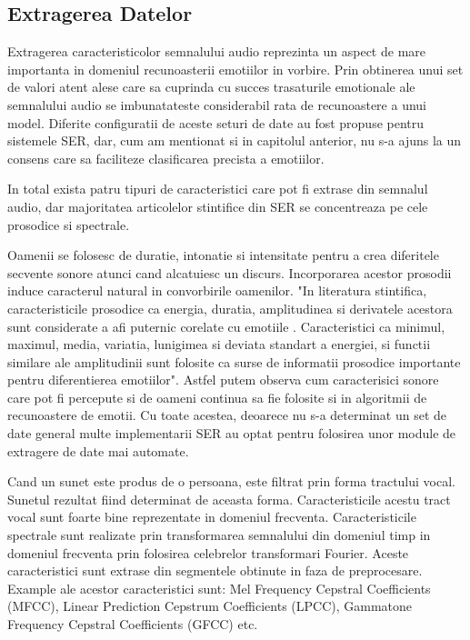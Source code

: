 \documentclass[a4paper,12pt, twoside]{book}
\begin{document}
					\subsection{Extragerea Datelor}
						Extragerea caracteristicolor semnalului audio reprezinta un aspect de mare importanta in domeniul recunoasterii emotiilor in vorbire. Prin obtinerea unui set de valori atent alese care sa cuprinda cu succes trasaturile emotionale ale semnalului audio se imbunatateste considerabil rata de recunoastere a unui model. Diferite configuratii de aceste seturi de date au fost propuse pentru sistemele SER, dar, cum am mentionat si in capitolul anterior, nu s-a ajuns la un consens care sa faciliteze clasificarea precista a emotiilor. \par
						In total exista patru tipuri de caracteristici care pot fi extrase din semnalul audio, dar majoritatea articolelor stintifice din SER se concentreaza pe cele prosodice si spectrale.\par
						Oamenii se folosesc de duratie, intonatie si intensitate pentru a crea diferitele secvente sonore atunci cand alcatuiesc un discurs. Incorporarea acestor prosodii induce caracterul natural in convorbirile oamenilor. "In literatura stintifica, caracteristicile prosodice ca energia, duratia, amplitudinea si derivatele acestora sunt considerate a afi puternic corelate cu emotiile \cite{dellaert}\cite{hcf1}\cite{hcf2}\cite{hcf3}. Caracteristici ca minimul, maximul, media, variatia, lunigimea si deviata standart a energiei, si functii similare ale amplitudinii sunt folosite ca surse de informatii prosodice importante pentru diferentierea emotiilor"\cite{koolagudi}. Astfel putem observa cum caracterisici sonore care pot fi percepute si de oameni continua sa fie folosite si in algoritmii de recunoastere de emotii. Cu toate acestea, deoarece nu s-a determinat un set de date general multe implementarii SER au optat pentru folosirea unor module de extragere de date mai automate. \par
						Cand un sunet este produs de o persoana, este filtrat prin forma tractului vocal. Sunetul rezultat fiind determinat de aceasta forma. Caracteristicile acestu tract vocal sunt foarte bine reprezentate in domeniul frecventa. Caracteristicile spectrale sunt realizate prin transformarea semnalului din domeniul timp in domeniul frecventa prin folosirea celebrelor transformari Fourier. Aceste caracteristici sunt extrase din segmentele obtinute in faza de preprocesare. Example ale acestor caracteristici sunt: Mel Frequency Cepstral Coefficients (MFCC), Linear Prediction Cepstrum Coefficients (LPCC), Gammatone Frequency Cepstral Coefficients (GFCC) etc. \par 
\end{document}
